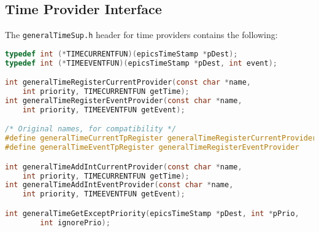 \subsection{Time Provider Interface}

The \verb|generalTimeSup.h| header for time providers contains the following:

\begin{lstlisting}[language=C]
typedef int (*TIMECURRENTFUN)(epicsTimeStamp *pDest);
typedef int (*TIMEEVENTFUN)(epicsTimeStamp *pDest, int event);

int generalTimeRegisterCurrentProvider(const char *name,
    int priority, TIMECURRENTFUN getTime);
int generalTimeRegisterEventProvider(const char *name,
    int priority, TIMEEVENTFUN getEvent);

/* Original names, for compatibility */
#define generalTimeCurrentTpRegister generalTimeRegisterCurrentProvider
#define generalTimeEventTpRegister generalTimeRegisterEventProvider

int generalTimeAddIntCurrentProvider(const char *name,
    int priority, TIMECURRENTFUN getTime);
int generalTimeAddIntEventProvider(const char *name,
    int priority, TIMEEVENTFUN getEvent);

int generalTimeGetExceptPriority(epicsTimeStamp *pDest, int *pPrio,
        int ignorePrio);
\end{lstlisting}

